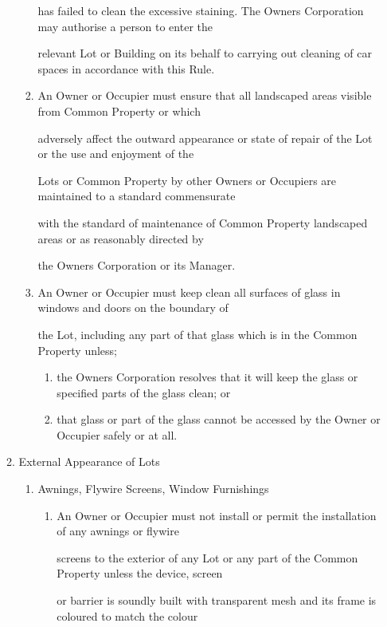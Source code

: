 \documentclass{article}
\begin{document}
\begin{enumerate}[label=\arabic*.]
\begin{enumerate}[label=\arabic{enumi}.\arabic*.]
\begin{enumerate}[label=(\arabic*)]
has failed to clean the excessive staining. The Owners Corporation may authorise a person to enter the 

relevant Lot or Building on its behalf to carrying out cleaning of car spaces in accordance with this Rule. 

\item  An Owner or Occupier must ensure that all landscaped areas visible from Common Property or which 

adversely affect the outward appearance or state of repair of the Lot or the use and enjoyment of the 

Lots or Common Property by other Owners or Occupiers are maintained to a standard commensurate 

with the standard of maintenance of Common Property landscaped areas or as reasonably directed by 

the Owners Corporation or its Manager. 

\item  An Owner or Occupier must keep clean all surfaces of glass in windows and doors on the boundary of 

the Lot, including any part of that glass which is in the Common Property unless; 

\begin{enumerate}[label=(\alph*)]
\item  the Owners Corporation resolves that it will keep the glass or specified parts of the glass clean; or 

\item  that glass or part of the glass cannot be accessed by the Owner or Occupier safely or at all. 

\end{enumerate}
\end{enumerate}
\item  External Appearance of Lots 

\begin{enumerate}[label=(\arabic*)]
\item  Awnings, Flywire Screens, Window Furnishings 

\begin{enumerate}[label=(\alph*)]
\item  An Owner or Occupier must not install or permit the installation of any awnings or flywire 

screens to the exterior of any Lot or any part of the Common Property unless the device, screen 

or barrier is soundly built with transparent mesh and its frame is coloured to match the colour 


\end{enumerate}
\end{enumerate}
\end{enumerate}
\end{enumerate}
\end{document}
